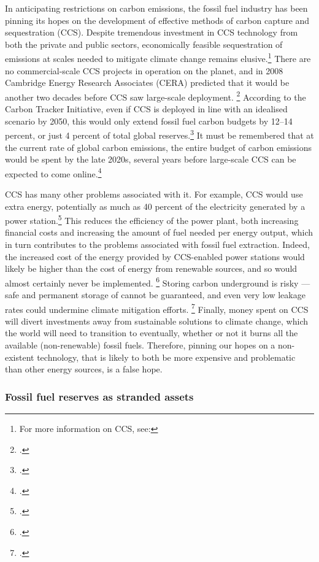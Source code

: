\documentclass[10pt]{article}
\begin{document}
In anticipating restrictions on carbon emissions, the fossil fuel industry has been pinning its hopes on the development of effective methods of carbon capture and sequestration (CCS). 
Despite tremendous investment in CCS technology from both the private and public sectors, economically feasible sequestration of emissions at scales needed to mitigate climate change remains elusive.\footnote{For more information on CCS, see: }
There are no commercial-scale CCS projects in operation on the planet, and in 2008 Cambridge Energy Research Associates (CERA) predicted that it would be another two decades before CCS saw large-scale deployment. \footcite{CERACrossing}
According to the Carbon Tracker Initiative, even if CCS is deployed in line with an idealised scenario by 2050, this would only extend fossil fuel carbon budgets by 12--14 percent, or just 4 percent of total global reserves.\footcite{CTI2013}
It must be remembered that at the current rate of global carbon emissions, the entire budget of carbon emissions would be spent by the late 2020s, several years before large-scale CCS can be expected to come online.\footcite{CTI2012}



CCS has many other problems associated with it. 
For example, CCS would use extra energy, potentially as much as 40 percent of the electricity generated by a power station.\footcite{GPCCS}
This reduces the efficiency of the power plant, both increasing financial costs and increasing the amount of fuel needed per energy output, which in turn contributes to the problems associated with fossil fuel extraction.
Indeed, the increased cost of the energy provided by CCS-enabled power stations would likely be higher than the cost of energy from renewable sources, and so would almost certainly never be implemented. \footcite{SmartPlanetCCS}
Storing carbon underground is risky --- safe and permanent storage of  cannot be guaranteed, and even very low leakage rates could undermine climate mitigation efforts. \footcite{GPCCS}
Finally, money spent on CCS will divert investments away from sustainable solutions to climate change, which the world will need to transition to eventually, whether or not it burns all the available (non-renewable) fossil fuels.
Therefore, pinning our hopes on a non-existent technology, that is likely to both be more expensive and problematic than other energy sources, is a false hope.



	\subsubsection {Fossil fuel reserves as stranded assets} 
\end{document}
